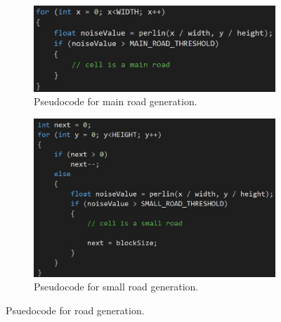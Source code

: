 	\begin{figure}[h]
		\begin{subfigure}{0.5\textwidth}
			\centering
			\includegraphics[width=0.9\linewidth]{"Images/main roads code"}
			\caption{Pseudocode for main road generation.}
			\label{fig:main-roads-code}
		\end{subfigure}
		\begin{subfigure}{0.5\textwidth}
			\centering
			\includegraphics[width=0.9\linewidth]{"Images/small roads code"}
			\caption{Pseudocode for small road generation.}
			\label{fig:small-roads-code}
		\end{subfigure}
		\caption{Psuedocode for road generation.}
		\label{fig:pseudo-code-roads}
	\end{figure}
		
